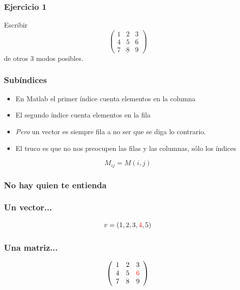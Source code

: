 \documentclass[12pt]{beamer}
\begin{document}
\begin{large}
\begin{frame}
\frametitle{Ejercicio 1}
\testcode
Escribir 
\[ \left(
\begin{array}{ccc}
1&2&3\\
4&5&6\\
7&8&9
\end{array} \right)
\]
de otros 3 modos posibles.
\end{frame}

\begin{frame}
\frametitle{Subíndices}
\begin{itemize}
  \item En Matlab el primer índice cuenta elementos en la columna
  \item El segundo índice cuenta elementos en la fila
  \item \emph{Pero} un vector es siempre fila a no ser que se diga lo
    contrario.
  \item El truco es que no nos preocupen las filas y las columnas,
    sólo los índices
\end{itemize}
\[ M_{ij} = M(i,j) \]
\end{frame}

\begin{frame}
\frametitle{No hay quien te entienda}
\testcode
\end{frame}


\begin{frame}
\frametitle{Un vector...}
\[v = (1,2,3,\textcolor{red}{4},5) \]
\testcode
\end{frame}


\begin{frame}
\frametitle{Una matriz...}
\[ \left(
\begin{array}{ccc}
1&2&3\\
4&5&\textcolor{red}{6}\\
7&8&9
\end{array} \right)
\]
\testcode
\end{frame}



\end{large}
\end{document}
